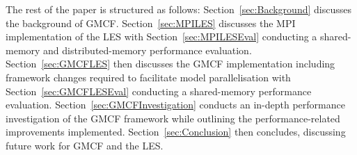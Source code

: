The rest of the paper is structured as follows: Section~\ref{sec:Background}
discusses the background of GMCF. Section~\ref{sec:MPILES} discusses the MPI
implementation of the LES with Section~\ref{sec:MPILESEval} conducting a
shared-memory and distributed-memory performance evaluation.
Section~\ref{sec:GMCFLES} then discusses the GMCF implementation including
framework changes required to facilitate model parallelisation with
Section~\ref{sec:GMCFLESEval} conducting a shared-memory performance evaluation.
Section~\ref{sec:GMCFInvestigation} conducts an in-depth performance
investigation of the GMCF framework while outlining the performance-related
improvements implemented. Section~\ref{sec:Conclusion} then concludes,
discussing future work for GMCF and the LES.
